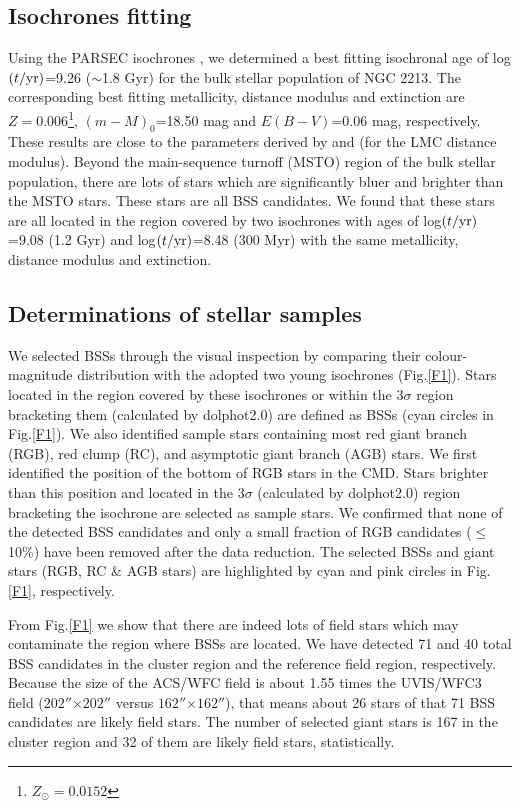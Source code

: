 \documentclass[useAMS,usenatbib,twocolumn]{mnras}
\begin{document}
\subsection{Isochrones fitting}
Using the PARSEC isochrones \citep{Bres12a}, we determined a best fitting isochronal age of log$(t/{\rm yr})$=9.26 ($\sim$1.8 Gyr) for the bulk stellar population of NGC 2213. The corresponding best fitting metallicity, distance modulus and extinction are $Z=0.006$\footnote{$Z_{\odot}=0.0152$}, $(m-M)_0$=18.50 mag and $E(B-V)$=0.06 mag, respectively. These results are close to the parameters derived by \cite{Baum13a} and \cite{grijs14a} (for the LMC distance modulus). Beyond the main-sequence turnoff (MSTO) region of the bulk stellar population, there are lots of stars which are significantly bluer and brighter than the MSTO stars. These stars are all BSS candidates. We found that these stars are all located in the region covered by two isochrones with ages of log$(t/{\rm yr})$=9.08 (1.2 Gyr) and log$(t/{\rm yr})$=8.48 (300 Myr) with the same metallicity, distance modulus and extinction.

\subsection{Determinations of stellar samples}
We selected BSSs through the visual inspection by comparing their colour-magnitude distribution with the adopted two young isochrones (Fig.\ref{F1}). Stars located in the region covered by these isochrones or within the 3$\sigma$ region bracketing them (calculated by {\sc dolphot2.0}) are defined as BSSs (cyan circles in Fig.\ref{F1}). We also identified sample stars containing most red giant branch (RGB), red clump (RC), and asymptotic giant branch (AGB) stars. We first identified the position of the bottom of RGB stars in the CMD. Stars brighter than this position and located in the 3$\sigma$ (calculated by {\sc dolphot2.0}) region bracketing the isochrone are selected as sample stars. We confirmed that none of the detected BSS candidates and only a small fraction of RGB candidates ($\leq$10\%) have been removed after the data reduction. The selected BSSs and giant stars (RGB, RC \& AGB stars) are highlighted by cyan and pink circles in Fig.\ref{F1}, respectively.

From Fig.\ref{F1} we show that there are indeed lots of field stars which may contaminate the region where BSSs are located. We have detected 71 and 40 total BSS candidates in the cluster region and the reference field region, respectively. Because the size of the ACS/WFC field is about 1.55 times the UVIS/WFC3 field ($202''$$\times$$202''$ versus $162''$$\times$$162''$), that means about 26 stars of that 71 BSS candidates are likely field stars. The number of selected giant stars is 167 in the cluster region and 32 of them are likely field stars, statistically.
\end{document}
